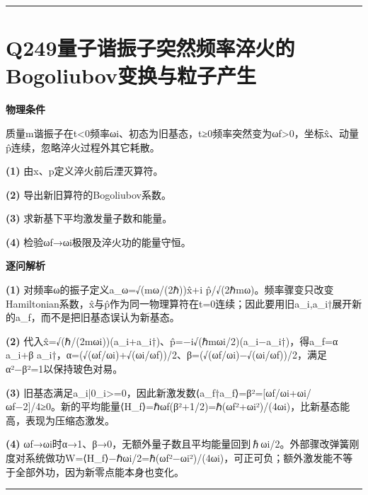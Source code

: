 \documentclass[UTF8,a4paper,11pt,oneside,openany]{ctexbook}
\begin{document}
\par\bigskip\hrule\bigskip
\section*{Q249\quad 量子谐振子突然频率淬火的Bogoliubov变换与粒子产生}
\textbf{物理条件}\par 质量m谐振子在t<0频率ωi、初态为旧基态，t≥0频率突然变为ωf>0，坐标x̂、动量p̂连续，忽略淬火过程外其它耗散。
\par\noindent\textbf{(1)} 由x、p定义淬火前后湮灭算符。
\par\noindent\textbf{(2)} 导出新旧算符的Bogoliubov系数。
\par\noindent\textbf{(3)} 求新基下平均激发量子数和能量。
\par\noindent\textbf{(4)} 检验ωf→ωi极限及淬火功的能量守恒。

\par\medskip\noindent\textbf{逐问解析}
\par\noindent\textbf{(1)} 对频率ω的振子定义a\_ω=√(mω/(2ℏ))x̂+i p̂/√(2ℏmω)。频率骤变只改变Hamiltonian系数，x̂与p̂作为同一物理算符在t=0连续；因此要用旧a\_i,a\_i†展开新的a\_f，而不是把旧基态误认为新基态。
\par\noindent\textbf{(2)} 代入x̂=√(ℏ/(2mωi))(a\_i+a\_i†)、p̂=−i√(ℏmωi/2)(a\_i−a\_i†)，得a\_f=α a\_i+β a\_i†，α=(√(ωf/ωi)+√(ωi/ωf))/2、β=(√(ωf/ωi)−√(ωi/ωf))/2，满足α²−β²=1以保持玻色对易。
\par\noindent\textbf{(3)} 旧基态满足a\_i|0\_i>=0，因此新激发数⟨a\_f†a\_f⟩=β²=[ωf/ωi+ωi/ωf−2]/4≥0。新的平均能量⟨H\_f⟩=ℏωf(β²+1/2)=ℏ(ωf²+ωi²)/(4ωi)，比新基态能高，表现为压缩态激发。
\par\noindent\textbf{(4)} ωf→ωi时α→1、β→0，无额外量子数且平均能量回到ℏωi/2。外部骤改弹簧刚度对系统做功W=⟨H\_f⟩−ℏωi/2=ℏ(ωf²−ωi²)/(4ωi)，可正可负；额外激发能不等于全部外功，因为新零点能本身也变化。

\par\bigskip\hrule\bigskip
\end{document}
